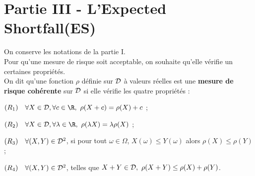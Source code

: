 \section*{Partie III - L'\og Expected Shortfall\fg (ES)}
\noindent
On conserve les notations de la partie I.\\
Pour qu'une mesure de risque soit acceptable, on souhaite qu'elle 
vérifie un certaines propriétés.\\
On dit qu'une fonction $\rho$ définie sur ${\cal D}$ à valeurs 
réelles est une {\bf mesure de risque cohérente} sur ${\cal D}$ 
si elle vérifie les quatre propriétés :
\begin{noliste}{}
  \item $(R_1) \quad \forall X \in {\cal D}, \forall c \in \R, \
  \rho(X+c)=\rho(X)+c$ ;
  
  \item $(R_2) \quad \forall X \in {\cal D}, \forall \lambda \in 
  \R, \ \rho(\lambda X)=\lambda \rho(X)$ ;
  
  \item $(R_3) \quad \forall(X,Y) \in {\cal D}^2$, si pour tout 
  $\omega \in \Omega$, $X(\omega) \leq Y(\omega)$ alors $\rho(X) 
  \leq \rho(Y)$ ;
  
  \item $(R_4) \quad \forall(X,Y) \in {\cal D}^2$, telles que $X+Y 
  \in {\cal D}, \ \rho(X+Y) \leq \rho(X)+\rho(Y)$.
\end{noliste}

